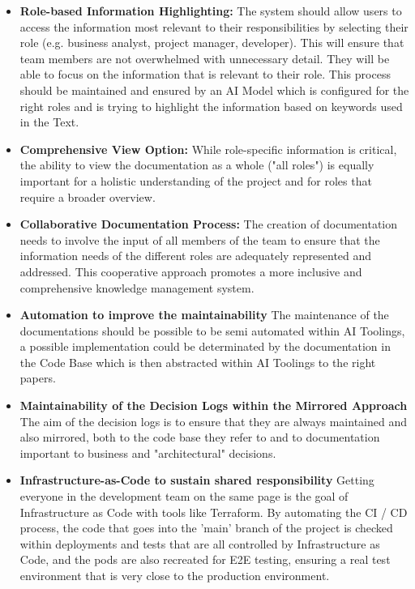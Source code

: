 \begin{itemize}
    \item \textbf{Role-based Information Highlighting:} The system should allow users to access the information most relevant to their responsibilities by selecting their role (e.g. business analyst, project manager, developer). This will ensure that team members are not overwhelmed with unnecessary detail. They will be able to focus on the information that is relevant to their role. This process should be maintained and ensured by an AI Model which is configured for the right roles and is trying to highlight the information based on keywords used in the Text.
    \item \textbf{Comprehensive View Option:} While role-specific information is critical, the ability to view the documentation as a whole ("all roles") is equally important for a holistic understanding of the project and for roles that require a broader overview.
    \item \textbf{Collaborative Documentation Process:} The creation of documentation needs to involve the input of all members of the team to ensure that the information needs of the different roles are adequately represented and addressed. This cooperative approach promotes a more inclusive and comprehensive knowledge management system.
    \item \textbf{Automation to improve the maintainability} The maintenance of the documentations should be
    possible to be semi automated within AI Toolings, a possible implementation could be determinated by the documentation in the Code Base which is then abstracted within AI Toolings to the right papers.
    \item \textbf{Maintainability of the Decision Logs within the Mirrored Approach} The aim of the decision logs is to ensure that they are always maintained and also mirrored, both to the code base they refer to and to documentation important to business and "architectural" decisions.
    \item \textbf{Infrastructure-as-Code to sustain shared responsibility} Getting everyone in the development team on the same page is the goal of Infrastructure as Code with tools like Terraform. By automating the CI / CD process, the code that goes into the 'main' branch of the project is checked within deployments and tests that are all controlled by Infrastructure as Code, and the pods are also recreated for E2E testing, ensuring a real test environment that is very close to the production environment.
\end{itemize}

